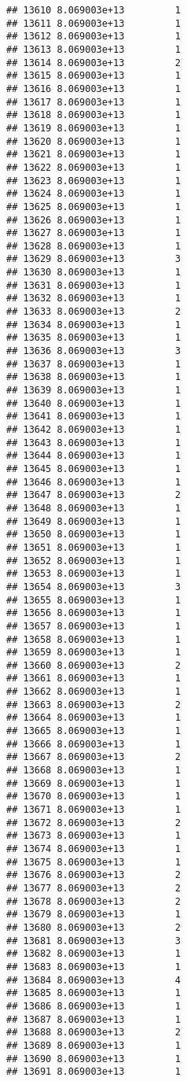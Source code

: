 \documentclass[
]{article}
\begin{document}
\begin{verbatim}
## 13610 8.069003e+13         1
## 13611 8.069003e+13         1
## 13612 8.069003e+13         1
## 13613 8.069003e+13         1
## 13614 8.069003e+13         2
## 13615 8.069003e+13         1
## 13616 8.069003e+13         1
## 13617 8.069003e+13         1
## 13618 8.069003e+13         1
## 13619 8.069003e+13         1
## 13620 8.069003e+13         1
## 13621 8.069003e+13         1
## 13622 8.069003e+13         1
## 13623 8.069003e+13         1
## 13624 8.069003e+13         1
## 13625 8.069003e+13         1
## 13626 8.069003e+13         1
## 13627 8.069003e+13         1
## 13628 8.069003e+13         1
## 13629 8.069003e+13         3
## 13630 8.069003e+13         1
## 13631 8.069003e+13         1
## 13632 8.069003e+13         1
## 13633 8.069003e+13         2
## 13634 8.069003e+13         1
## 13635 8.069003e+13         1
## 13636 8.069003e+13         3
## 13637 8.069003e+13         1
## 13638 8.069003e+13         1
## 13639 8.069003e+13         1
## 13640 8.069003e+13         1
## 13641 8.069003e+13         1
## 13642 8.069003e+13         1
## 13643 8.069003e+13         1
## 13644 8.069003e+13         1
## 13645 8.069003e+13         1
## 13646 8.069003e+13         1
## 13647 8.069003e+13         2
## 13648 8.069003e+13         1
## 13649 8.069003e+13         1
## 13650 8.069003e+13         1
## 13651 8.069003e+13         1
## 13652 8.069003e+13         1
## 13653 8.069003e+13         1
## 13654 8.069003e+13         3
## 13655 8.069003e+13         1
## 13656 8.069003e+13         1
## 13657 8.069003e+13         1
## 13658 8.069003e+13         1
## 13659 8.069003e+13         1
## 13660 8.069003e+13         2
## 13661 8.069003e+13         1
## 13662 8.069003e+13         1
## 13663 8.069003e+13         2
## 13664 8.069003e+13         1
## 13665 8.069003e+13         1
## 13666 8.069003e+13         1
## 13667 8.069003e+13         2
## 13668 8.069003e+13         1
## 13669 8.069003e+13         1
## 13670 8.069003e+13         1
## 13671 8.069003e+13         1
## 13672 8.069003e+13         2
## 13673 8.069003e+13         1
## 13674 8.069003e+13         1
## 13675 8.069003e+13         1
## 13676 8.069003e+13         2
## 13677 8.069003e+13         2
## 13678 8.069003e+13         2
## 13679 8.069003e+13         1
## 13680 8.069003e+13         2
## 13681 8.069003e+13         3
## 13682 8.069003e+13         1
## 13683 8.069003e+13         1
## 13684 8.069003e+13         4
## 13685 8.069003e+13         1
## 13686 8.069003e+13         1
## 13687 8.069003e+13         1
## 13688 8.069003e+13         2
## 13689 8.069003e+13         1
## 13690 8.069003e+13         1
## 13691 8.069003e+13         1

\end{verbatim}
\end{document}
